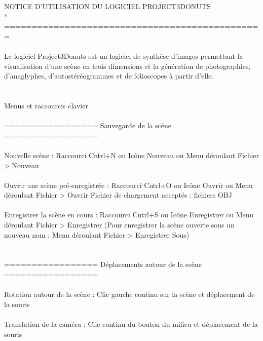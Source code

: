NOTICE D'UTILISATION DU LOGICIEL PROJECT3DONUTS\\*
===============================================
\\ \\
Le logiciel Project3Donuts est un logiciel de synthèse d'images permettant la visualisation d'une scène en trois dimensions et la génération de photographies, d'anaglyphes, d'autostéréogrammes et de folioscopes à partir d'elle.
\\ \\ \\
Menus et raccourcis clavier
\\ \\
================= Sauvegarde de la scène =================
\\ \\
Nouvelle scène :			Raccourci Cntrl+N     
	       	 			ou     Icône Nouveau     
		 			ou     Menu déroulant Fichier > Nouveau
\\ \\
Ouvrir une scène pré-enregistrée : 	Raccourci Cntrl+O
       	   	 		   	ou      Icône Ouvrir
				   	ou	Menu déroulant Fichier > Ouvrir
		Fichier de chargement acceptés : fichiers OBJ
\\ \\
Enregistrer la scène en cours :       	Raccourci Cntrl+S
	       	     	      		ou 	Icône Enregistrer
					ou 	Menu déroulant Fichier > Enregistrer
		(Pour enregistrer la scène ouverte sous un nouveau nom : Menu déroulant Fichier > Enregistrer Sous)
\\ \\ \\
================= Déplacements autour de la scène =================
\\ \\
Rotation autour de la scène :  	        Clic gauche continu sur la scène et déplacement de la souris
\\ \\
Translation de la caméra :                    Clic continu du bouton du milieu et déplacement de la souris
\\ \\

